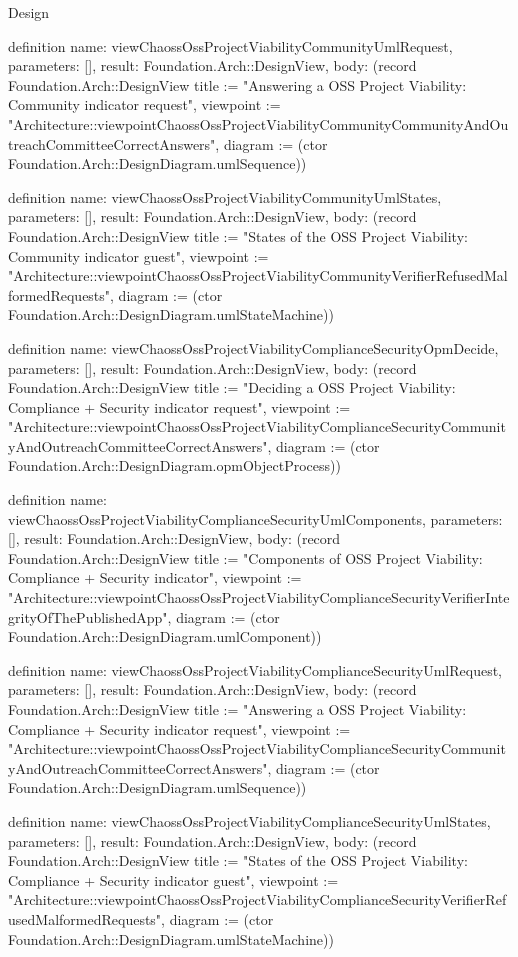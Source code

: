 \begin{lexlean}{Design}
\begin{semanticmodule}
definition{
  name: viewChaossOssProjectViabilityCommunityUmlRequest,
  parameters: [],
  result: Foundation.Arch::DesignView,
  body: (record Foundation.Arch::DesignView {title := "Answering a OSS Project Viability: Community indicator request", viewpoint := "Architecture::viewpointChaossOssProjectViabilityCommunityCommunityAndOutreachCommitteeCorrectAnswers", diagram := (ctor Foundation.Arch::DesignDiagram.umlSequence)})
}

definition{
  name: viewChaossOssProjectViabilityCommunityUmlStates,
  parameters: [],
  result: Foundation.Arch::DesignView,
  body: (record Foundation.Arch::DesignView {title := "States of the OSS Project Viability: Community indicator guest", viewpoint := "Architecture::viewpointChaossOssProjectViabilityCommunityVerifierRefusedMalformedRequests", diagram := (ctor Foundation.Arch::DesignDiagram.umlStateMachine)})
}

definition{
  name: viewChaossOssProjectViabilityComplianceSecurityOpmDecide,
  parameters: [],
  result: Foundation.Arch::DesignView,
  body: (record Foundation.Arch::DesignView {title := "Deciding a OSS Project Viability: Compliance + Security indicator request", viewpoint := "Architecture::viewpointChaossOssProjectViabilityComplianceSecurityCommunityAndOutreachCommitteeCorrectAnswers", diagram := (ctor Foundation.Arch::DesignDiagram.opmObjectProcess)})
}

definition{
  name: viewChaossOssProjectViabilityComplianceSecurityUmlComponents,
  parameters: [],
  result: Foundation.Arch::DesignView,
  body: (record Foundation.Arch::DesignView {title := "Components of OSS Project Viability: Compliance + Security indicator", viewpoint := "Architecture::viewpointChaossOssProjectViabilityComplianceSecurityVerifierIntegrityOfThePublishedApp", diagram := (ctor Foundation.Arch::DesignDiagram.umlComponent)})
}

definition{
  name: viewChaossOssProjectViabilityComplianceSecurityUmlRequest,
  parameters: [],
  result: Foundation.Arch::DesignView,
  body: (record Foundation.Arch::DesignView {title := "Answering a OSS Project Viability: Compliance + Security indicator request", viewpoint := "Architecture::viewpointChaossOssProjectViabilityComplianceSecurityCommunityAndOutreachCommitteeCorrectAnswers", diagram := (ctor Foundation.Arch::DesignDiagram.umlSequence)})
}

definition{
  name: viewChaossOssProjectViabilityComplianceSecurityUmlStates,
  parameters: [],
  result: Foundation.Arch::DesignView,
  body: (record Foundation.Arch::DesignView {title := "States of the OSS Project Viability: Compliance + Security indicator guest", viewpoint := "Architecture::viewpointChaossOssProjectViabilityComplianceSecurityVerifierRefusedMalformedRequests", diagram := (ctor Foundation.Arch::DesignDiagram.umlStateMachine)})
}


\end{semanticmodule}
\end{lexlean}

